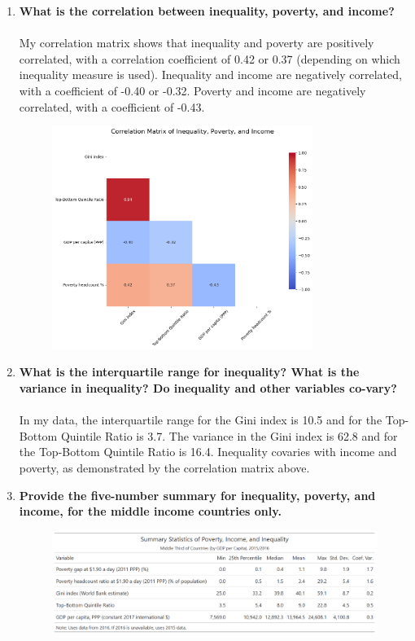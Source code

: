 \documentclass[12pt]{article}
\begin{document}
\begin{enumerate}
\begin{enumerate}
    \end{enumerate}
    \item \textbf{What is the correlation between inequality, poverty, and income?}
    \\\\
    My correlation matrix shows that inequality and poverty are positively correlated, with a correlation coefficient of 0.42 or 0.37 (depending on which inequality measure is used). Inequality and income are negatively correlated, with a coefficient of -0.40 or -0.32. Poverty and income are negatively correlated, with a coefficient of -0.43.
    \begin{figure}[H]
        \centering
        \includegraphics[width=0.8\textwidth]{./output/correlation_matrix.png}
    \end{figure}
    \item \textbf{What is the interquartile range for inequality? What is the variance in inequality? Do inequality and other variables co-vary?}
    \\\\
    In my data, the interquartile range for the Gini index is 10.5 and for the Top-Bottom Quintile Ratio is 3.7. The variance in the Gini index is 62.8 and for the Top-Bottom Quintile Ratio is 16.4. Inequality covaries with income and poverty, as demonstrated by the correlation matrix above.
    \item \textbf{Provide the five-number summary for inequality, poverty, and income, for the middle income countries only.}
    \begin{figure}[H]
        \centering
        \includegraphics[width=\textwidth]{./output/summary_stats_table_middle_income.PNG}

\end{figure}
\end{enumerate}
\end{document}
